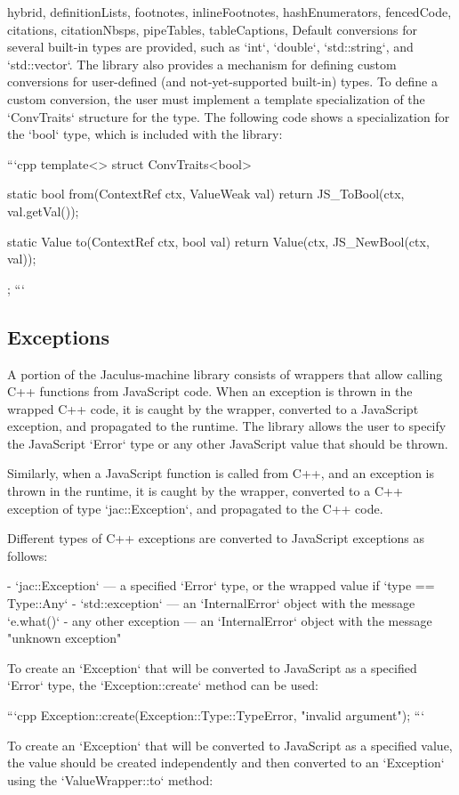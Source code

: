 \begin{markdown*}{%
  hybrid,
  definitionLists,
  footnotes,
  inlineFootnotes,
  hashEnumerators,
  fencedCode,
  citations,
  citationNbsps,
  pipeTables,
  tableCaptions,
}
Default conversions for several built-in types are provided, such as `int`, `double`, `std::string`, and `std::vector`. The library also provides a mechanism for defining custom conversions for user-defined (and not-yet-supported built-in) types. To define a custom conversion, the user must implement a template specialization of the `ConvTraits` structure for the type. The following code shows a specialization for the `bool` type, which is included with the library:

```cpp
template<>
struct ConvTraits<bool> {
    static bool from(ContextRef ctx, ValueWeak val) {
        return JS_ToBool(ctx, val.getVal());
    }

    static Value to(ContextRef ctx, bool val) {
        return Value(ctx, JS_NewBool(ctx, val));
    }
};
```

\subsection{Exceptions}

A portion of the Jaculus-machine library consists of wrappers that allow calling C++ functions from JavaScript code. When an exception is thrown in the wrapped C++ code, it is caught by the wrapper, converted to a JavaScript exception, and propagated to the runtime. The library allows the user to specify the JavaScript `Error` type or any other JavaScript value that should be thrown.

Similarly, when a JavaScript function is called from C++, and an exception is thrown in the runtime, it is caught by the wrapper, converted to a C++ exception of type `jac::Exception`, and propagated to the C++ code.

Different types of C++ exceptions are converted to JavaScript exceptions as follows:

  - `jac::Exception` --- a specified `Error` type, or the wrapped value if `type == Type::Any`
  - `std::exception` --- an `InternalError` object with the message `e.what()`
  - any other exception --- an `InternalError` object with the message "unknown exception"

To create an `Exception` that will be converted to JavaScript as a specified `Error` type, the `Exception::create` method can be used:

```cpp
Exception::create(Exception::Type::TypeError, "invalid argument");
```

To create an `Exception` that will be converted to JavaScript as a specified value, the value should be created independently and then converted to an `Exception` using the `ValueWrapper::to` method:


\end{markdown*}
